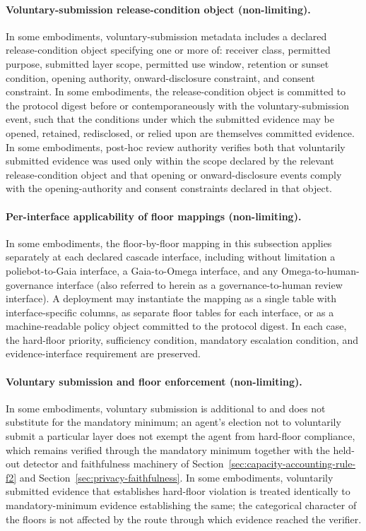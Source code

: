 \documentclass[a4paper,12pt]{article}
\begin{document}
\paragraph{Voluntary-submission release-condition object (non-limiting).}
In some embodiments, voluntary-submission metadata includes a
declared release-condition object specifying one or more of:
receiver class, permitted purpose, submitted layer scope, permitted
use window, retention or sunset condition, opening authority,
onward-disclosure constraint, and consent constraint. In some
embodiments, the release-condition object is committed to the
protocol digest before or contemporaneously with the
voluntary-submission event, such that the conditions under which the
submitted evidence may be opened, retained, redisclosed, or relied
upon are themselves committed evidence. In some embodiments,
post-hoc review authority verifies both that voluntarily submitted
evidence was used only within the scope declared by the relevant
release-condition object and that opening or onward-disclosure
events comply with the opening-authority and consent constraints
declared in that object.



\paragraph{Per-interface applicability of floor mappings (non-limiting).}
In some embodiments, the floor-by-floor mapping in this subsection
applies separately at each declared cascade interface, including
without limitation a
poliebot-to-Gaia interface, a Gaia-to-Omega interface, and any
Omega-to-human-governance interface (also referred to herein as
a governance-to-human review interface). A deployment may instantiate
the mapping as a single table with interface-specific columns, as
separate floor tables for each interface, or as a machine-readable
policy object committed to the protocol digest. In each case, the
hard-floor priority, sufficiency condition, mandatory escalation
condition, and evidence-interface requirement are preserved.

\paragraph{Voluntary submission and floor enforcement (non-limiting).}
In some embodiments, voluntary submission is additional to and does
not substitute for the mandatory minimum; an agent's election not
to voluntarily submit a particular layer does not exempt the agent
from hard-floor compliance, which remains verified through the
mandatory minimum together with the held-out detector and
faithfulness machinery of Section~\ref{sec:capacity-accounting-rule-f2}
and Section~\ref{sec:privacy-faithfulness}. In some embodiments,
voluntarily submitted evidence that establishes hard-floor violation
is treated identically to mandatory-minimum evidence establishing
the same; the categorical character of the floors is not affected
by the route through which evidence reached the verifier.
\end{document}
